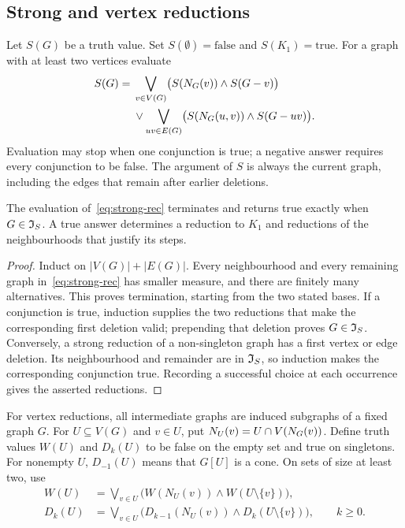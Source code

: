 \subsection{Strong and vertex reductions}

Let $S(G)$ be a truth value. Set $S(\emptyset)=\mathrm{false}$ and
$S(K_1)=\mathrm{true}$. For a graph with at least two vertices evaluate
\begin{align}
 S(G)={}&\bigvee_{v\in V(G)}
 \bigl(S(N_G(v))\land S(G-v)\bigr)\notag\\
 &{}\lor\bigvee_{uv\in E(G)}
 \bigl(S(N_G(u,v))\land S(G-uv)\bigr).
 \label{eq:strong-rec}
\end{align}
Evaluation may stop when one conjunction is true; a negative answer
requires every conjunction to be false. The argument of $S$ is always
the current graph, including the edges that remain after earlier
deletions.

\begin{proposition}\label{prop:IS-correct}
The evaluation of~\eqref{eq:strong-rec} terminates and returns true
exactly when $G\in\mathfrak I_S$. A true answer determines a reduction to $K_1$
and reductions of the neighbourhoods that justify its steps.
\end{proposition}
\begin{proof}
Induct on $|V(G)|+|E(G)|$. Every neighbourhood and every remaining
graph in~\eqref{eq:strong-rec} has smaller measure, and there are
finitely many alternatives. This proves termination, starting from
the two stated bases. If a conjunction is true, induction supplies
the two reductions that make the corresponding first deletion valid;
prepending that deletion proves $G\in\mathfrak I_S$. Conversely, a strong
reduction of a non-singleton graph has a first vertex or edge deletion.
Its neighbourhood and remainder are in $\mathfrak I_S$, so induction makes
the corresponding conjunction true. Recording a successful choice
at each occurrence gives the asserted reductions.
\end{proof}

For vertex reductions, all intermediate graphs are induced subgraphs
of a fixed graph $G$. For $U\subseteq V(G)$ and $v\in U$, put
$N_U(v)=U\cap V(N_G(v))$. Define truth values $W(U)$ and $D_k(U)$
to be false on the empty set and true on singletons. For nonempty $U$,
$D_{-1}(U)$ means that $G[U]$ is a cone. On sets of size at least two,
use
\begin{align}
 W(U)&=\bigvee_{v\in U}
     \bigl(W(N_U(v))\land W(U\setminus\{v\})\bigr),
     \label{eq:ivs-rec}\\
 D_k(U)&=\bigvee_{v\in U}
     \bigl(D_{k-1}(N_U(v))\land D_k(U\setminus\{v\})\bigr),
     \qquad k\ge0.\label{eq:kdis-rec}
\end{align}

